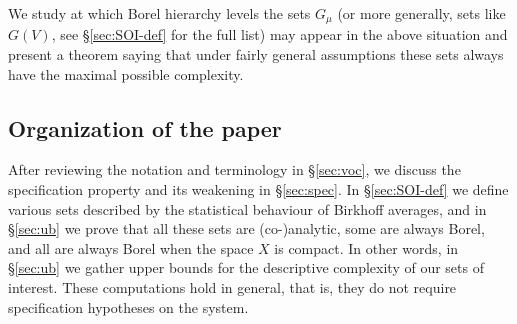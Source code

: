 \documentclass{amsart}
\theoremstyle{definition}
\newcommand{\bp}{\boldsymbol{\Pi}}
\newcommand{\sA}{\mathscr{A}}
\newcommand{\co}[1]{{\color{red}#1}}
\begin{document}
We study at which Borel hierarchy levels the sets $G_\mu$ (or more
generally, sets like $G(V)$, see \S\ref{sec:SOI-def} for the full list) may appear in the above situation and present a
theorem saying that under fairly general assumptions these sets always
have the maximal possible complexity.








\subsection*{Organization of the paper}
After reviewing the notation and terminology in \S\ref{sec:voc},
we discuss the specification property and its weakening in \S\ref{sec:spec}. In  \S\ref{sec:SOI-def} we define
various sets described by the statistical behaviour of Birkhoff averages, and in \S\ref{sec:ub} we prove that all these sets are (co-)analytic, some are always Borel, and all are always Borel when the space $X$ is compact. In other words, in \S\ref{sec:ub} we gather upper bounds for the descriptive complexity of our sets of interest.
These computations hold in general, that is, they do not require specification hypotheses on the system.
\end{document}

